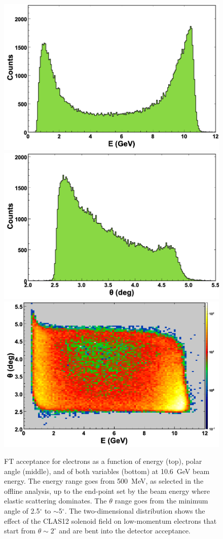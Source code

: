 \begin{figure}[ht]
\begin{center}
\includegraphics[height=0.5\columnwidth]{fig/ft_acceptance_energy.png}
\includegraphics[height=0.5\columnwidth]{fig/ft_acceptance_theta.png}
\includegraphics[height=0.5\columnwidth]{fig/ft_acceptance_energytheta.png}
\end{center}
\caption{FT acceptance for electrons as a function of energy (top), polar angle (middle), and of both variables
  (bottom) at 10.6~GeV beam energy. The energy range goes from 500~MeV, as selected in the offline analysis, up
  to the end-point set by the beam energy where elastic scattering dominates. The $\theta$ range goes from the
  minimum angle of 2.5$^\circ$ to $\sim$5$^\circ$. The two-dimensional distribution shows the effect of the CLAS12
  solenoid field on low-momentum electrons that start from $\theta\sim2^\circ$ and are bent into the detector
  acceptance. }
\label{fig:ft_acceptance}
\end{figure}

